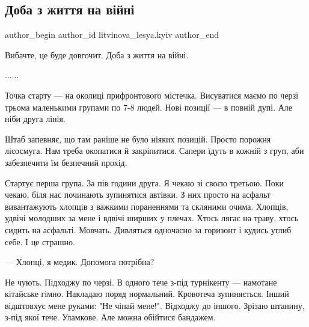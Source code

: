  
 
 
 
 

\subsection{Доба з  життя на війні}
\label{sec:27_05_2023.fb.litvinova_lesya.kyiv.1.doba_z_zhyttja_na_vijni}

\ifcmt
 author_begin
   author_id litvinova_lesya.kyiv
 author_end
\fi

Вибачте, це буде довгочит. Доба з  життя на війні.

......

Точка  старту  —   на околиці прифронтового  містечка.  Висуватися маємо  по
черзі трьома маленькими групами по  7-8 людей. Нові позиції —  в повній  дупі.
Але ніби друга лінія.  

Штаб запевняє,  що там раніше не було ніяких позицій. Просто порожня лісосмуга.
Нам треба окопатися й закріпитися. Сапери їдуть в кожній з груп, аби
забезпечити їм безпечний прохід. 


Стартує перша  група. За пів години  друга. Я чекаю зі своєю третьою.  Поки
чекаю, біля нас починають зупинятися  автівки. З них просто на асфальт
вивантажують хлопців з важкими пораненнями та скляними очима. Хлопців, удвічі
молодших за мене і вдвічі ширших у плечах. Хтось лягає на траву, хтось сидить
на асфальті.  Мовчать. Дивляться одночасно за горизонт і кудись углиб себе. І
це страшно. 

— Хлопці, я медик. Допомога потрібна?

Не чують. Підходжу по черзі.  В одного тече з-під турнікенту — намотане
кітайське гімно. Накладаю поряд нормальний. Кровотеча зупиняється. Інший
відштовхує мене руками: "Не чіпай мене!". Відходжу до іншого. Зрізаю штанину,
з-під якої тече. Уламкове. Але можна обійтися бандажем.  

